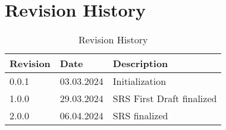 \chapter*{Revision History}
 
\begin{table}[H]
\centering
\begin{tabular}{|l|l|l|} 
\hline
Revision & Date       & Description      \\ 
\hline
0.0.1    & 03.03.2024 & Initialization   \\ 
\hline
1.0.0    & 29.03.2024 & SRS First Draft finalized  \\
\hline
2.0.0    & 06.04.2024 & SRS finalized  \\
\hline
\end{tabular}
\caption{Revision History}
\end{table}
